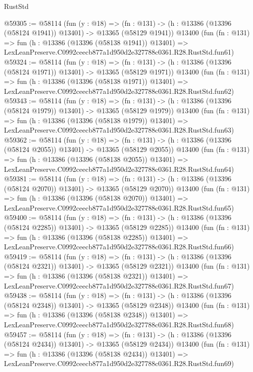 \begin{lexlean}{RustStd}
\begin{coremodule}
@59305 := @58114
    (fun (y : @18) =>
    (fn : @131) -> (h : @13386 (@13396 (@58124 @1941)) @13401) -> @13365 (@58129 @1941))
    @13400
    (fun (fn : @131) =>
    fun (h : @13386 (@13396 (@58138 @1941)) @13401) =>
    LexLeanPreserve.C0992ceecb877a1d950d2e327788c0361.R28.RustStd.fun61)
@59324 := @58114
    (fun (y : @18) =>
    (fn : @131) -> (h : @13386 (@13396 (@58124 @1971)) @13401) -> @13365 (@58129 @1971))
    @13400
    (fun (fn : @131) =>
    fun (h : @13386 (@13396 (@58138 @1971)) @13401) =>
    LexLeanPreserve.C0992ceecb877a1d950d2e327788c0361.R28.RustStd.fun62)
@59343 := @58114
    (fun (y : @18) =>
    (fn : @131) -> (h : @13386 (@13396 (@58124 @1979)) @13401) -> @13365 (@58129 @1979))
    @13400
    (fun (fn : @131) =>
    fun (h : @13386 (@13396 (@58138 @1979)) @13401) =>
    LexLeanPreserve.C0992ceecb877a1d950d2e327788c0361.R28.RustStd.fun63)
@59362 := @58114
    (fun (y : @18) =>
    (fn : @131) -> (h : @13386 (@13396 (@58124 @2055)) @13401) -> @13365 (@58129 @2055))
    @13400
    (fun (fn : @131) =>
    fun (h : @13386 (@13396 (@58138 @2055)) @13401) =>
    LexLeanPreserve.C0992ceecb877a1d950d2e327788c0361.R28.RustStd.fun64)
@59381 := @58114
    (fun (y : @18) =>
    (fn : @131) -> (h : @13386 (@13396 (@58124 @2070)) @13401) -> @13365 (@58129 @2070))
    @13400
    (fun (fn : @131) =>
    fun (h : @13386 (@13396 (@58138 @2070)) @13401) =>
    LexLeanPreserve.C0992ceecb877a1d950d2e327788c0361.R28.RustStd.fun65)
@59400 := @58114
    (fun (y : @18) =>
    (fn : @131) -> (h : @13386 (@13396 (@58124 @2285)) @13401) -> @13365 (@58129 @2285))
    @13400
    (fun (fn : @131) =>
    fun (h : @13386 (@13396 (@58138 @2285)) @13401) =>
    LexLeanPreserve.C0992ceecb877a1d950d2e327788c0361.R28.RustStd.fun66)
@59419 := @58114
    (fun (y : @18) =>
    (fn : @131) -> (h : @13386 (@13396 (@58124 @2321)) @13401) -> @13365 (@58129 @2321))
    @13400
    (fun (fn : @131) =>
    fun (h : @13386 (@13396 (@58138 @2321)) @13401) =>
    LexLeanPreserve.C0992ceecb877a1d950d2e327788c0361.R28.RustStd.fun67)
@59438 := @58114
    (fun (y : @18) =>
    (fn : @131) -> (h : @13386 (@13396 (@58124 @2348)) @13401) -> @13365 (@58129 @2348))
    @13400
    (fun (fn : @131) =>
    fun (h : @13386 (@13396 (@58138 @2348)) @13401) =>
    LexLeanPreserve.C0992ceecb877a1d950d2e327788c0361.R28.RustStd.fun68)
@59457 := @58114
    (fun (y : @18) =>
    (fn : @131) -> (h : @13386 (@13396 (@58124 @2434)) @13401) -> @13365 (@58129 @2434))
    @13400
    (fun (fn : @131) =>
    fun (h : @13386 (@13396 (@58138 @2434)) @13401) =>
    LexLeanPreserve.C0992ceecb877a1d950d2e327788c0361.R28.RustStd.fun69)

\end{coremodule}
\end{lexlean}
